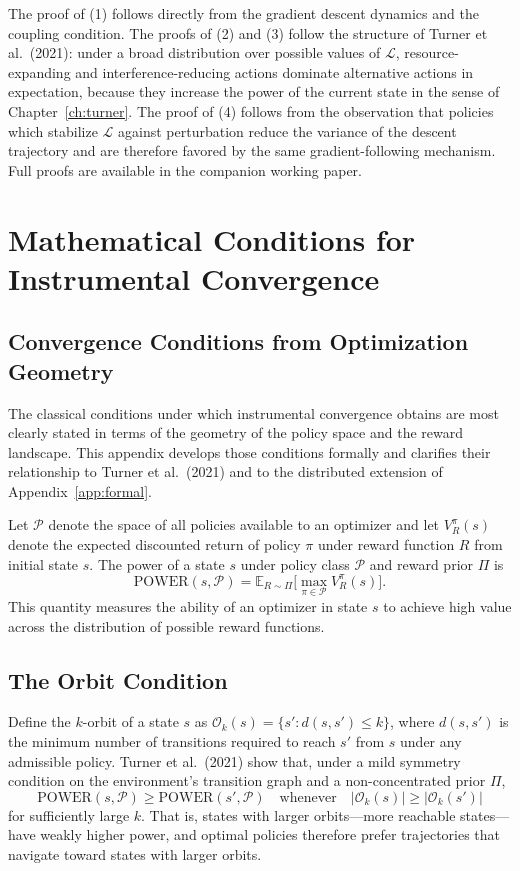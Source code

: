 \documentclass[12pt, oneside]{book}
\theoremstyle{plain}
\theoremstyle{definition}
\theoremstyle{remark}
\theoremstyle{definition}
\begin{document}
The proof of (1) follows directly from the gradient descent dynamics and the
coupling condition. The proofs of (2) and (3) follow the structure of Turner et
al.\ (2021): under a broad distribution over possible values of $\mathcal{L}$,
resource-expanding and interference-reducing actions dominate alternative actions
in expectation, because they increase the power of the current state in the sense
of Chapter~\ref{ch:turner}. The proof of (4) follows from the observation that
policies which stabilize $\mathcal{L}$ against perturbation reduce the variance of
the descent trajectory and are therefore favored by the same gradient-following
mechanism. Full proofs are available in the companion working paper.

\chapter{Mathematical Conditions for Instrumental Convergence}
\label{app:math}

\section{Convergence Conditions from Optimization Geometry}

The classical conditions under which instrumental convergence obtains are most
clearly stated in terms of the geometry of the policy space and the reward landscape.
This appendix develops those conditions formally and clarifies their relationship to
Turner et al.\ (2021) and to the distributed extension of Appendix~\ref{app:formal}.

Let $\mathcal{P}$ denote the space of all policies available to an optimizer and
let $V^\pi_R(s)$ denote the expected discounted return of policy $\pi$ under reward
function $R$ from initial state $s$. The power of a state $s$ under policy class
$\mathcal{P}$ and reward prior $\Pi$ is
\[
\mathrm{POWER}(s, \mathcal{P}) = \mathbb{E}_{R \sim \Pi}\bigl[\max_{\pi \in \mathcal{P}} V^\pi_R(s)\bigr].
\]
This quantity measures the ability of an optimizer in state $s$ to achieve high
value across the distribution of possible reward functions.

\section{The Orbit Condition}

Define the $k$-orbit of a state $s$ as
$\mathcal{O}_k(s) = \{s' : d(s, s') \leq k\}$,
where $d(s, s')$ is the minimum number of transitions required to reach $s'$ from
$s$ under any admissible policy. Turner et al.\ (2021) show that, under a mild
symmetry condition on the environment's transition graph and a non-concentrated
prior $\Pi$,
\[
\mathrm{POWER}(s, \mathcal{P}) \geq \mathrm{POWER}(s', \mathcal{P})
\quad \text{whenever} \quad |\mathcal{O}_k(s)| \geq |\mathcal{O}_k(s')|
\]
for sufficiently large $k$. That is, states with larger orbits---more reachable
states---have weakly higher power, and optimal policies therefore prefer trajectories
that navigate toward states with larger orbits.
\end{document}
